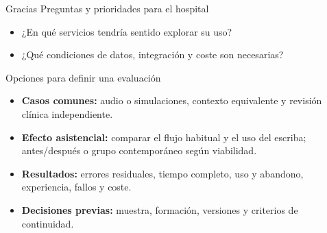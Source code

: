 \documentclass[aspectratio=169,10pt]{beamer}
\begin{document}
\begin{frame}{Gracias}
\vspace{7mm}
{\Large Preguntas y prioridades para el hospital}
\par\vspace{7mm}
\begin{itemize}
\item ¿En qué servicios tendría sentido explorar su uso?
\item ¿Qué condiciones de datos, integración y coste son necesarias?
\end{itemize}
\end{frame}

\appendix
\backuptrue
\renewcommand{\backupid}{A1}
\begin{frame}[t,noframenumbering]{Opciones para definir una evaluación}
\begin{itemize}
\item \textbf{Casos comunes:} audio o simulaciones, contexto equivalente y revisión clínica independiente.
\item \textbf{Efecto asistencial:} comparar el flujo habitual y el uso del escriba; antes/después o grupo contemporáneo según viabilidad.
\item \textbf{Resultados:} errores residuales, tiempo completo, uso y abandono, experiencia, fallos y coste.
\item \textbf{Decisiones previas:} muestra, formación, versiones y criterios de continuidad.
\end{itemize}
\end{frame}
\end{document}
